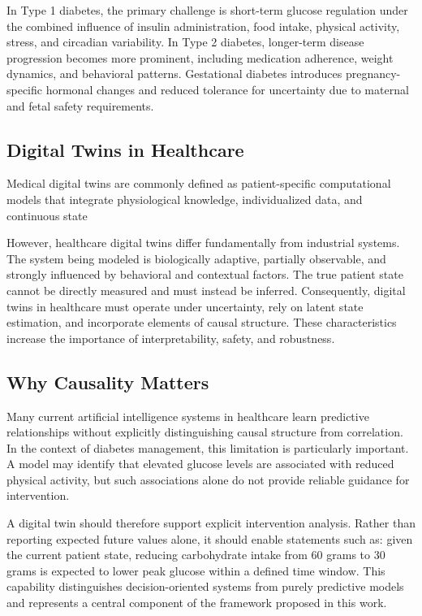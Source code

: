 \documentclass[journal]{IEEEtran}
\begin{document}
In Type 1 diabetes, the primary challenge is short-term glucose regulation under the combined influence of insulin administration, food intake, physical activity, stress, and circadian variability. In Type 2 diabetes, longer-term disease progression becomes more prominent, including medication adherence, weight dynamics, and behavioral patterns. Gestational diabetes introduces pregnancy-specific hormonal changes and reduced tolerance for uncertainty due to maternal and fetal safety requirements.


\subsection{Digital Twins in Healthcare}
Medical digital twins are commonly defined as patient-specific computational models that integrate physiological knowledge, individualized data, and continuous state 

However, healthcare digital twins differ fundamentally from industrial systems. The system being modeled is biologically adaptive, partially observable, and strongly influenced by behavioral and contextual factors. The true patient state cannot be directly measured and must instead be inferred. Consequently, digital twins in healthcare must operate under uncertainty, rely on latent state estimation, and incorporate elements of causal structure. These characteristics increase the importance of interpretability, safety, and robustness.

\subsection{Why Causality Matters}
Many current artificial intelligence systems in healthcare learn predictive relationships without explicitly distinguishing causal structure from correlation. In the context of diabetes management, this limitation is particularly important. A model may identify that elevated glucose levels are associated with reduced physical activity, but such associations alone do not provide reliable guidance for intervention.

A digital twin should therefore support explicit intervention analysis. Rather than reporting expected future values alone, it should enable statements such as: given the current patient state, reducing carbohydrate intake from 60 grams to 30 grams is expected to lower peak glucose within a defined time window. This capability distinguishes decision-oriented systems from purely predictive models and represents a central component of the framework proposed in this work.
\end{document}
